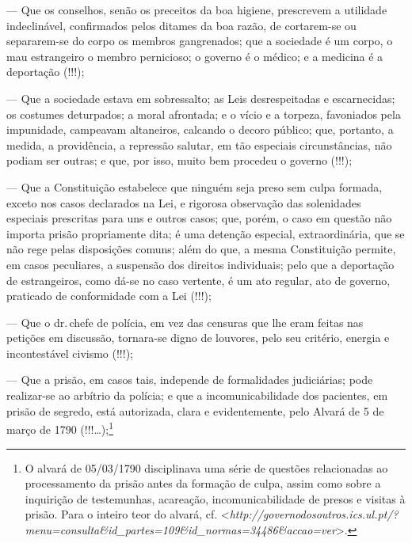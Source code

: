 --- Que os conselhos, senão os preceitos da boa higiene, prescrevem a
  utilidade indeclinável, confirmados pelos ditames da boa razão, de
  cortarem-se ou separarem-se do corpo os membros gangrenados; que a
  sociedade é um corpo, o mau estrangeiro o membro pernicioso; o governo
  é o médico; e a medicina é a deportação (!!!);

--- Que a sociedade estava em sobressalto; as Leis desrespeitadas e
  escarnecidas; os costumes deturpados; a moral afrontada; e o vício e a
  torpeza, favoniados pela impunidade, campeavam altaneiros, calcando o
  decoro público; que, portanto, a medida, a providência, a repressão
  salutar, em tão especiais circunstâncias, não podiam ser
  outras; e que, por isso, muito bem procedeu o governo (!!!);

--- Que a Constituição estabelece que ninguém seja preso sem culpa
  formada, exceto nos casos declarados na Lei, e rigorosa observação das
  solenidades especiais prescritas para uns e outros casos; que, porém,
  o caso em questão não importa prisão propriamente dita; é uma detenção
  especial, extraordinária, que se não rege pelas disposições comuns;
  além do que, a mesma Constituição permite, em casos peculiares, a
  suspensão dos direitos individuais; pelo que a deportação de
  estrangeiros, como dá-se no caso vertente, é um ato regular, ato de
  governo, praticado de conformidade com a Lei (!!!);

--- Que o dr.\,chefe de polícia, em vez das censuras que lhe eram feitas
  nas petições em discussão, tornara-se digno de louvores, pelo seu
  critério, energia e incontestável civismo (!!!);

--- Que a prisão, em casos tais, independe de formalidades judiciárias;
  pode realizar-se ao arbítrio da polícia; e que a incomunicabilidade
  dos pacientes, em prisão de segredo, está autorizada, clara e
  evidentemente, pelo Alvará de 5 de março de 1790 (!!!\ldots{});\footnote{
    O alvará de 05/03/1790 disciplinava uma série de questões
    relacionadas ao processamento da prisão antes da formação de culpa,
    assim como sobre a inquirição de testemunhas, acareação,
    incomunicabilidade de presos e visitas à prisão. Para o inteiro teor
    do alvará, cf.
    \textless{}\emph{http://governodosoutros.ics.ul.pt/?menu=consulta\&id\_partes=109\&id\_normas=34486\&accao=ver}\textgreater{}.}


